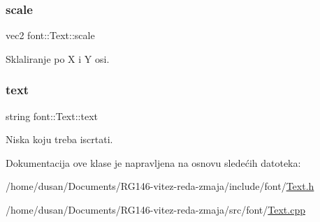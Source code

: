 \subsubsection{\texorpdfstring{scale}{scale}}
{\footnotesize\ttfamily vec2 font\+::\+Text\+::scale\hspace{0.3cm}{\ttfamily [private]}}



Sklaliranje po X i Y osi. 

\mbox{\label{classfont_1_1Text_aee63974ff23d9e971bbd04fe041ccb07}} 
\subsubsection{\texorpdfstring{text}{text}}
{\footnotesize\ttfamily string font\+::\+Text\+::text\hspace{0.3cm}{\ttfamily [private]}}



Niska koju treba iscrtati. 



Dokumentacija ove klase je napravljena na osnovu sledećih datoteka\+:\begin{DoxyCompactItemize}
\item 
/home/dusan/\+Documents/\+R\+G146-\/vitez-\/reda-\/zmaja/include/font/\hyperlink{Text_8h}{Text.\+h}\item 
/home/dusan/\+Documents/\+R\+G146-\/vitez-\/reda-\/zmaja/src/font/\hyperlink{Text_8cpp}{Text.\+cpp}\end{DoxyCompactItemize}
